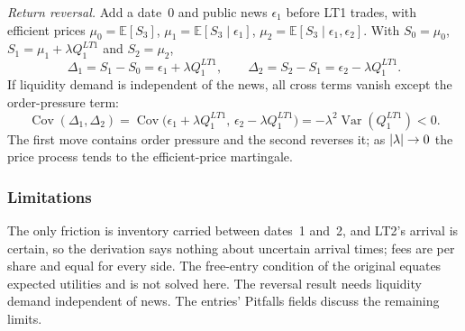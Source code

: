 \emph{Return reversal.} Add a date~0 and public news $\epsilon_1$ before LT1 trades, with efficient prices $\mu_0=\mathbb{E}[S_3]$, $\mu_1=\mathbb{E}[S_3\mid\epsilon_1]$, $\mu_2=\mathbb{E}[S_3\mid\epsilon_1,\epsilon_2]$. With $S_0=\mu_0$, $S_1=\mu_1+\lambda Q_1^{LT1}$ and $S_2=\mu_2$,
\[ \Delta_1=S_1-S_0=\epsilon_1+\lambda Q_1^{LT1},\qquad \Delta_2=S_2-S_1=\epsilon_2-\lambda Q_1^{LT1}. \]
If liquidity demand is independent of the news, all cross terms vanish except the order-pressure term:
\[ \operatorname{Cov}(\Delta_1,\Delta_2)=\operatorname{Cov}\big(\epsilon_1+\lambda Q_1^{LT1},\,\epsilon_2-\lambda Q_1^{LT1}\big)=-\lambda^2\operatorname{Var}(Q_1^{LT1})<0. \]
The first move contains order pressure and the second reverses it; as $\left\lvert\lambda\right\rvert\to0$ the price process tends to the efficient-price martingale.

\subsubsection{Limitations}
The only friction is inventory carried between dates~1 and~2, and LT2's arrival is certain, so the derivation says nothing about uncertain arrival times; fees are per share and equal for every side. The free-entry condition of the original equates expected utilities and is not solved here. The reversal result needs liquidity demand independent of news. The entries' Pitfalls fields discuss the remaining limits.
